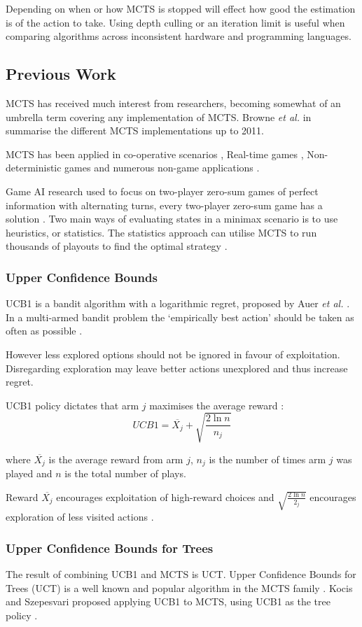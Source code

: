 \documentclass[conference]{IEEEtran}
\begin{document}
Depending on when or how MCTS is stopped will effect how good the estimation is of the action to take. Using depth culling or an iteration limit is useful when comparing algorithms across inconsistent hardware and programming languages.

\subsection{Previous Work}
MCTS has received much interest from researchers, becoming somewhat of an umbrella term covering any implementation of MCTS. Browne {\em et al.} in \cite{b2} summarise the different MCTS implementations up to 2011.

MCTS has been applied in co-operative scenarios \cite{b5}, Real-time games \cite{b2}, Non-deterministic games \cite{b7} and numerous non-game applications \cite{b2}.

Game AI research used to focus on two-player zero-sum games of perfect information with alternating turns\cite{b2}, every two-player zero-sum game has a solution \cite{bartle}. Two main ways of evaluating states in a minimax scenario is to use heuristics, or statistics. The statistics approach can utilise MCTS to run thousands of playouts to find the optimal strategy \cite{bartle}.

\subsubsection{Upper Confidence Bounds}
UCB1 is a bandit algorithm with a logarithmic regret, proposed by Auer {\em et al.} \cite{ucb1}. In a multi-armed bandit problem the `empirically best action' should be taken as often as possible \cite{ucb1}. 

However less explored options should not be ignored in favour of exploitation. Disregarding exploration may leave better actions unexplored and thus increase regret. 

UCB1 policy dictates that arm $j$ maximises the average reward \cite{ucb1}:
\[UCB1 = \overline{X_{j}} + \sqrt{\frac{2 \ln n}{n_{j}}}\]

where $\overline{X_{j}}$ is the average reward from arm $j$, $n_{j}$ is the number of times arm $j$ was played and $n$ is the total number of plays.

Reward $\overline{X_{j}}$ encourages exploitation of high-reward choices \cite{ucb1} and $\sqrt{\frac{2 \ln n}{2_{j}}}$ encourages exploration of less visited actions \cite{b2}.

\subsubsection{Upper Confidence Bounds for Trees}
The result of combining UCB1 and MCTS is UCT. Upper Confidence Bounds for Trees (UCT) is a well known and popular algorithm in the MCTS family \cite{b2}. Kocis and Szepesvari \cite{kocsze} proposed applying UCB1 to MCTS, using UCB1 as the tree policy \cite{b2}.
\end{document}
